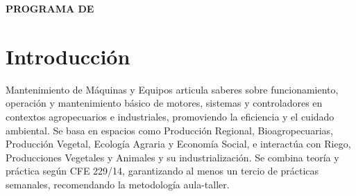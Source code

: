 \documentclass[../main]{subfiles}
\begin{document}
\begin{center}
\textbf{PROGRAMA DE \materiaLong}
\end{center}

\section*{Introducción}
Mantenimiento de Máquinas y Equipos articula saberes sobre funcionamiento, operación y mantenimiento básico de motores, sistemas y controladores en contextos agropecuarios e industriales, promoviendo la eficiencia y el cuidado ambiental. Se basa en espacios como Producción Regional, Bioagropecuarias, Producción Vegetal, Ecología Agraria y Economía Social, e interactúa con Riego, Producciones Vegetales y Animales y su industrialización. Se combina teoría y práctica según CFE 229/14, garantizando al menos un tercio de prácticas semanales, recomendando la metodología aula-taller.
\end{document}
